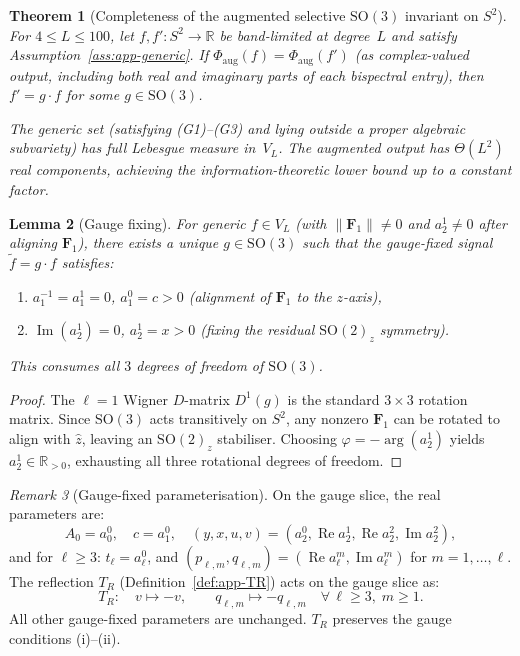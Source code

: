 \documentclass{article}
\newtheorem{theorem}{Theorem}
\newtheorem{lemma}[theorem]{Lemma}
\theoremstyle{definition}
\theoremstyle{remark}
\newtheorem{remark}[theorem]{Remark}
\DeclareMathOperator{\im}{Im}
\newcommand{\R}{\mathbb{R}}
\newcommand{\SO}{\mathrm{SO}}
\newcommand{\norm}[1]{\lVert #1 \rVert}
\theoremstyle{definition}
\begin{document}
\begin{theorem}[Completeness of the augmented selective $\SO(3)$ invariant on $S^2$]
\label{thm:app-main}
For $4 \le L \le 100$, let $f, f' : S^2 \to \R$ be band-limited at degree~$L$
and satisfy Assumption~\ref{ass:app-generic}. If
$\Phi_{\mathrm{aug}}(f) = \Phi_{\mathrm{aug}}(f')$
(as complex-valued output, including both real and imaginary parts
of each bispectral entry), then $f' = g \cdot f$ for some $g \in \SO(3)$.

The generic set (satisfying (G1)--(G3) and lying outside a proper
algebraic subvariety) has full Lebesgue measure in~$V_L$.
The augmented output has $\Theta(L^2)$ real components, achieving the
information-theoretic lower bound up to a constant factor.
\end{theorem}

\begin{lemma}[Gauge fixing]\label{lem:app-gauge}
For generic $f \in V_L$ (with $\norm{\mathbf{F}_1} \ne 0$ and $a_2^1 \ne 0$
after aligning $\mathbf{F}_1$), there exists a unique $g \in \SO(3)$ such that
the gauge-fixed signal $\tilde{f} = g \cdot f$ satisfies:
\begin{enumerate}[nosep,label=(\roman*)]
\item $a_1^{-1} = a_1^1 = 0$, \quad $a_1^0 = c > 0$ \quad
  (alignment of $\mathbf{F}_1$ to the $z$-axis),
\item $\im(a_2^1) = 0$, \quad $a_2^1 = x > 0$ \quad
  (fixing the residual $\SO(2)_z$ symmetry).
\end{enumerate}
This consumes all $3$ degrees of freedom of $\SO(3)$.
\end{lemma}
\begin{proof}
The $\ell=1$ Wigner $D$-matrix $D^1(g)$ is the standard $3 \times 3$
rotation matrix. Since $\SO(3)$ acts transitively on $S^2$, any nonzero
$\mathbf{F}_1$ can be rotated to align with $\hat{z}$, leaving an
$\SO(2)_z$ stabiliser. Choosing
$\varphi = -\arg(a_2^1)$ yields $a_2^1 \in \R_{>0}$, exhausting all
three rotational degrees of freedom.
\end{proof}

\begin{remark}[Gauge-fixed parameterisation]\label{rem:app-gauge-param}
On the gauge slice, the real parameters are:
\[
  A_0 = a_0^0, \quad c = a_1^0, \quad
  (y, x, u, v) = (a_2^0, \operatorname{Re}a_2^1, \operatorname{Re}a_2^2, \im a_2^2),
\]
and for $\ell \ge 3$: $t_\ell = a_\ell^0$, and
$(p_{\ell,m}, q_{\ell,m}) = (\operatorname{Re}a_\ell^m, \im a_\ell^m)$ for $m = 1,\ldots,\ell$.
The reflection $T_R$ (Definition~\ref{def:app-TR}) acts on the gauge slice as:
\begin{equation}\label{eq:app-TR-action}
  T_R: \quad v \mapsto -v, \qquad
  q_{\ell,m} \mapsto -q_{\ell,m} \quad \forall\, \ell \ge 3, \; m \ge 1.
\end{equation}
All other gauge-fixed parameters are unchanged.
$T_R$ preserves the gauge conditions (i)--(ii).
\end{remark}
\end{document}
